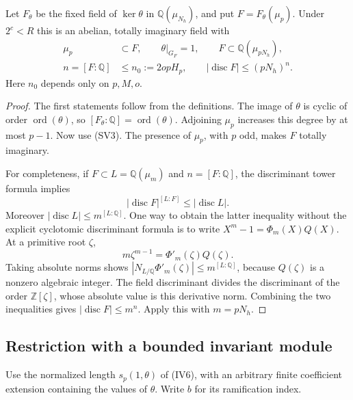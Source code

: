 \begin{lemma}\label{sv-field}
Let $F_\theta$ be the fixed field of $\ker\theta$ in
$\mathbb Q(\mu_{N_h})$, and put $F=F_\theta(\mu_p)$.
Under $2^c<R$ this is an abelian, totally imaginary field with
\[
 \begin{split}
 \mu_p&\subset F,\qquad \theta|_{G_F}=1,\qquad
 F\subset\mathbb Q(\mu_{pN_h}),\\
 n=[F:\mathbb Q]&\le n_0:=2opH_p,\qquad
                   |\operatorname{disc}F|\le(pN_h)^n.
 \end{split}                                                   \tag{SV4}
\]
Here $n_0$ depends only on $p,M,o$.
\end{lemma}
\begin{proof}
The first statements follow from the definitions. The image of
$\theta$ is cyclic of order $\operatorname{ord}(\theta)$, so
$[F_\theta:\mathbb Q]=\operatorname{ord}(\theta)$.
Adjoining $\mu_p$ increases this degree by at most $p-1$.
Now use (SV3). The presence of $\mu_p$, with $p$ odd, makes
$F$ totally imaginary.

For completeness, if $F\subset L=\mathbb Q(\mu_m)$ and
$n=[F:\mathbb Q]$, the discriminant tower formula implies
\[
             |\operatorname{disc}F|^{[L:F]}
                                      \le|\operatorname{disc}L|.
\]
Moreover $|\operatorname{disc}L|\le m^{[L:\mathbb Q]}$.
One way to obtain the latter inequality without the explicit
cyclotomic discriminant formula is to write
$X^m-1=\Phi_m(X)Q(X)$. At a primitive root $\zeta$,
\[
                 m\zeta^{m-1}=\Phi'_m(\zeta)Q(\zeta).
\]
Taking absolute norms shows
$|N_{L/\mathbb Q}\Phi'_m(\zeta)|\le m^{[L:\mathbb Q]}$,
because $Q(\zeta)$ is a nonzero algebraic integer. The
field discriminant divides the discriminant of the order
$\mathbb Z[\zeta]$, whose absolute value is this derivative
norm. Combining the two inequalities gives
$|\operatorname{disc}F|\le m^n$. Apply this with $m=pN_h$.
\end{proof}

\subsection{Restriction with a bounded invariant module}

Use the normalized length $s_p(1,\theta)$ of (IV6), with an
arbitrary finite coefficient extension containing the values of
$\theta$. Write $b$ for its ramification index.

